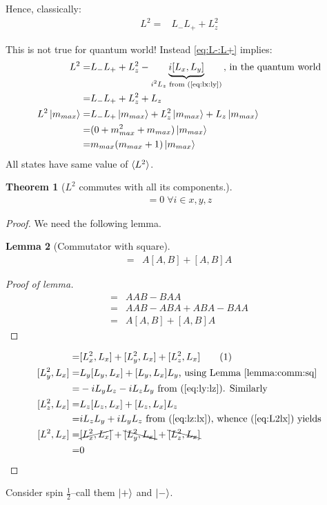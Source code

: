 \documentclass[]{article}
\newcommand\numberthis{\addtocounter{equation}{1}\tag{\theequation}}
\newtheorem{thm}{Theorem}
\newtheorem{lemma}[thm]{Lemma}
\begin{document}
Hence, classically:
\begin{align*}
	L^2 =& L_- L_+ + L_z^2
\end{align*}

This is not true for quantum world! Instead \eqref{eq:L-:L+} implies:
\begin{align*}
	 L^2 =& L_- L_+ + L_z^2 -\underbrace{i[L_x,L_y]}_\text{$i^2L_z$ from (\ref{eq:lx:ly})}\text{, in the quantum world}\\
	=& L_- L_+ + L_z^2 +L_z\\
	L^2 \ket{m_{max}}=& L_- L_+ \ket{m_{max}} + L_z^2 \ket{m_{max}} +L_z \ket{m_{max}}\\
	=& (0 +m_{max}^2 + m_{max})\ket{m_{max}} \\
	=& m_{max} (m_{max}+1)\ket{m_{max}}
\end{align*}
All states have same value of $\braket{L^2}$. 

\begin{thm}[$L^2$ commutes with all its components.]
	 \begin{align*}
	 [L^2,L_i]=0  \;\forall i \in {x,y,z}
	 \end{align*}
\end{thm}
\begin{proof}
	We need the following lemma.
	\begin{lemma}[Commutator with square]\label{lemma:comm:sq}
		\begin{align*}
			[A^2,B] =& A[A,B] + [A,B]A
		\end{align*}
	\end{lemma}
	\begin{proof}[Proof of lemma]
		\begin{align*}
			[A^2,B] =& AAB - BAA\\
			=& AAB - ABA +ABA -BAA\\
			=& A[A,B] + [A,B]A
		\end{align*}
	\end{proof}
	\begin{align*}
	[L^2,L_x]=&[L_x^2,L_x] + [L_y^2,L_x] + [L_z^2,L_x] \numberthis \label{eq:L2lx}\\
	[L_y^2,L_x] =&L_y[L_y,L_x] + [L_y,L_x]L_y \text{, using Lemma \ref{lemma:comm:sq}}\\
	=& -i L_y L_z -i L_z L_y \text{ from (\ref{eq:ly:lz}). Similarly}\\
	[L_z^2,L_x] = &L_z [L_z,L_x] + [L_z,L_x] L_z\\
	=& i L_z L_y  + i L_y L_z \text{ from (\ref{eq:lz:lx}), whence (\ref{eq:L2lx}) yields}\\
	[L^2,L_x]=&\cancel{[L_x^2,L_x] }+\bcancel{ [L_y^2,L_x]} + \bcancel{[L_z^2,L_x]}\\
	=& 0
	\end{align*}
\end{proof}
Consider spin $\frac{1}{2}$--call them $\ket{+}$ and  $\ket{-}$.
\end{document}
